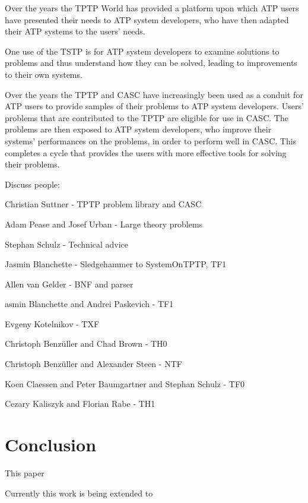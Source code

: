 \documentclass{easychair}
\newenvironment{packed_itemize}{
\vspace*{-0.2em}
\begin{itemize}
\setlength{\partopsep}{0pt}
\setlength{\itemsep}{1pt}
\setlength{\parskip}{0pt}
\setlength{\parsep}{0pt}
}{\end{itemize}}
\begin{document}
Over the years the TPTP World has provided a platform upon which ATP users have presented their 
needs to ATP system developers, who have then adapted their ATP systems to the users’ needs.

One use of the TSTP is for ATP system developers to examine solutions to problems and thus 
understand how they can be solved, leading to improvements to their own systems. 

Over the years the TPTP and CASC have increasingly been used as a conduit for ATP users to provide 
samples of their problems to ATP system developers.
Users' problems that are contributed to the TPTP are eligible for use in CASC.
The problems are then exposed to ATP system developers, who improve their systems' performances 
on the problems, in order to perform well in CASC.
This completes a cycle that provides the users with more effective tools for solving their 
problems.

Discuss people:
\begin{packed_itemize}
\item Christian Suttner - TPTP problem library and CASC
\item Adam Pease and Josef Urban - Large theory problems
\item Stephan Schulz - Technical advice
\item Jasmin Blanchette - Sledgehammer to SystemOnTPTP, TF1
\item Allen van Gelder - BNF and parser
\item asmin Blanchette and Andrei Paskevich - TF1
\item Evgeny Kotelnikov - TXF
\item Christoph Benz{\"u}ller and Chad Brown - TH0
\item Christoph Benz{\"u}ller and Alexander Steen - NTF
\item Koen Claessen and Peter Baumgartner and Stephan Schulz - TF0
\item Cezary Kaliszyk and Florian Rabe - TH1
\end{packed_itemize}

\section{Conclusion}
\label{Conclusion}

This paper 

Currently this work is being extended to 



\end{document}
